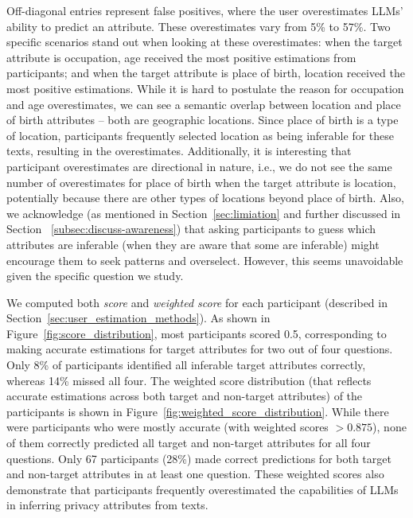 Off-diagonal entries represent false positives, where the user overestimates LLMs' ability to predict an attribute. These overestimates vary from 5\% to 57\%. Two specific scenarios stand out when looking at these overestimates: when the target attribute is occupation, age received the most positive estimations from participants; and when the target attribute is place of birth, location received the most positive estimations. While it is hard to postulate the reason for occupation and age overestimates, we can see a semantic overlap between location and place of birth attributes -- both are geographic locations. Since place of birth is a type of location, participants frequently selected location as being inferable for these texts, resulting in the overestimates. Additionally, it is interesting that participant overestimates are directional in nature, i.e., we do not see the same number of overestimates for place of birth when the target attribute is location, potentially because there are other types of locations beyond place of birth. Also, we acknowledge (as mentioned in Section~\ref{sec:limiation} and further discussed in Section ~\ref{subsec:discuss-awareness}) that asking participants to guess which attributes are inferable (when they are aware that some are inferable) might encourage them to seek patterns and overselect. However, this seems unavoidable given the specific question we study. 



We computed both \textit{score} and \textit{weighted score} for each participant (described in Section~\ref{sec:user_estimation_methods}). 
As shown in Figure~\ref{fig:score_distribution}, most participants scored 0.5, corresponding to making accurate estimations for target attributes for two out of four questions. Only 8\% of participants identified all inferable target attributes correctly, whereas 14\% missed all four. 
The weighted score distribution (that reflects accurate estimations across both target and non-target attributes) of the participants is shown in Figure~\ref{fig:weighted_score_distribution}. While there were participants who were mostly accurate (with weighted scores $>0.875$), none of them correctly predicted all target and non-target attributes for all four questions. Only 67 participants (28\%) made correct predictions for both target and non-target attributes in at least one question. These weighted scores also demonstrate that participants frequently overestimated the capabilities of LLMs in inferring privacy attributes from texts.

